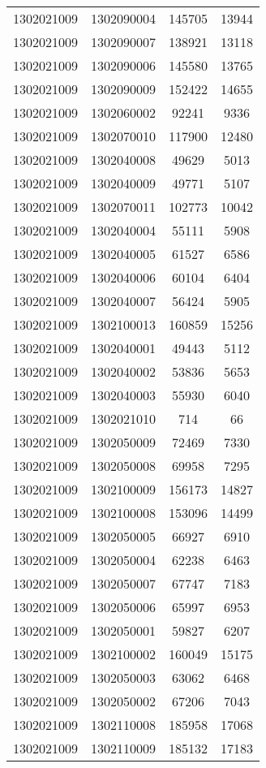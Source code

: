 \begin{longtable}{llcc}
1302021009 & 1302090004 & 145705 & 13944\\
1302021009 & 1302090007 & 138921 & 13118\\
1302021009 & 1302090006 & 145580 & 13765\\
1302021009 & 1302090009 & 152422 & 14655\\
1302021009 & 1302060002 & 92241 & 9336\\
1302021009 & 1302070010 & 117900 & 12480\\
1302021009 & 1302040008 & 49629 & 5013\\
1302021009 & 1302040009 & 49771 & 5107\\
1302021009 & 1302070011 & 102773 & 10042\\
1302021009 & 1302040004 & 55111 & 5908\\
1302021009 & 1302040005 & 61527 & 6586\\
1302021009 & 1302040006 & 60104 & 6404\\
1302021009 & 1302040007 & 56424 & 5905\\
1302021009 & 1302100013 & 160859 & 15256\\
1302021009 & 1302040001 & 49443 & 5112\\
1302021009 & 1302040002 & 53836 & 5653\\
1302021009 & 1302040003 & 55930 & 6040\\
1302021009 & 1302021010 & 714 & 66\\
1302021009 & 1302050009 & 72469 & 7330\\
1302021009 & 1302050008 & 69958 & 7295\\
1302021009 & 1302100009 & 156173 & 14827\\
1302021009 & 1302100008 & 153096 & 14499\\
1302021009 & 1302050005 & 66927 & 6910\\
1302021009 & 1302050004 & 62238 & 6463\\
1302021009 & 1302050007 & 67747 & 7183\\
1302021009 & 1302050006 & 65997 & 6953\\
1302021009 & 1302050001 & 59827 & 6207\\
1302021009 & 1302100002 & 160049 & 15175\\
1302021009 & 1302050003 & 63062 & 6468\\
1302021009 & 1302050002 & 67206 & 7043\\
1302021009 & 1302110008 & 185958 & 17068\\
1302021009 & 1302110009 & 185132 & 17183\\

\end{longtable}
